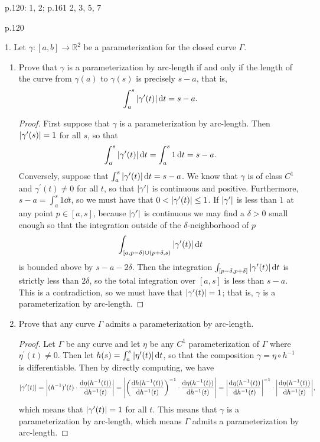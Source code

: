 \documentclass[11pt]{article}
\newcommand{\br}[1]{\left(#1\right)}
\begin{document}
p.120: 1, 2; p.161 2, 3, 5, 7

p.120

1. Let $\gamma\colon [a,b]\to \mathbb{R}^2$ be a parameterization for the closed curve $\Gamma$.
\begin{enumerate}[label=(\alph*)]
    \item Prove that $\gamma$ is a parameterization by arc-length if and only if the length of the curve from $\gamma(a)$ to $\gamma(s)$ is precisely $s-a$, that is,
    \[\int_a^s \abs{\gamma^{\prime}(t)}\dd{t} = s-a.\]
    \begin{proof}
      First suppose that $\gamma$ is a parameterization by arc-length. Then $\abs{\gamma^{\prime}(s)} = 1$ for all $s$, so that \[\int_a^s \abs{\gamma^{\prime}(t)}\dd{t} = \int_a^s 1 \dd{t} = s-a.\]
      Conversely, suppose that $\int_a^s \abs{\gamma^{\prime}(t)}\dd{t} = s-a$. We know that $\gamma$ is of class $C^1$ and $\gamma^{\prime}(t)\neq 0$ for all $t$, so that $\abs{\gamma^{\prime}}$ is continuous and positive. Furthermore, $s-a =\int_a^s 1 \dd{t}$, so we must have that $0 < \abs{\gamma^{\prime}(t)} \leq 1$. If $\abs{\gamma^{\prime}}$ is less than $1$ at any point $p\in [a,s]$, because $\abs{\gamma^{\prime}}$ is continuous we may find a $\delta > 0$ small enough so that the integration outside of the $\delta$-neighborhood of $p$ \[\int_{[a,p-\delta)\cup (p+\delta, s)}\abs{\gamma^{\prime}(t)}\dd{t}\]
      is bounded above by $s-a-2\delta$. Then the integration $\int_{[p-\delta, p+\delta]}\abs{\gamma^{\prime}(t)}\dd{t}$ is strictly less than $2\delta$, so the total integration over $[a,s]$ is less than $s-a$. This is a contradiction, so we must have that $\abs{\gamma^{\prime}(t)} = 1$; that is, $\gamma$ is a parameterization by arc-length.
    \end{proof}
    \item Prove that any curve $\Gamma$ admits a parameterization by arc-length. 
    \begin{proof}
      Let $\Gamma$ be any curve and let $\eta$ be any $C^1$ parameterization of $\Gamma$ where $\eta^{\prime}(t)\neq 0$. Then let $h(s) = \int_a^s\abs{\eta^{\prime}(t)}\dd{t}$, so that the composition $\gamma = \eta \circ h^{-1}$ is differentiable. Then by directly computing, we have \[\abs{\gamma^{\prime}(t)} = \abs{(h^{-1})^{\prime}(t)\cdot \dv{\eta(h^{-1}(t))}{h^{-1}(t)}} = \abs{ \br{ \dv{h(h^{-1}(t))}{h^{-1}(t)} }^{-1} \cdot \dv{\eta(h^{-1}(t))}{h^{-1}(t)}} = \abs{\dv{\eta(h^{-1}(t))}{h^{-1}(t)}}^{-1}\cdot \abs{\dv{\eta(h^{-1}(t))}{h^{-1}(t)}},\] which means that $\abs{\gamma^{\prime}(t)} = 1$ for all $t$. This means that $\gamma$ is a parameterization by arc-length, which means $\Gamma$ admits a parameterization by arc-length.
    \end{proof}
\end{enumerate} 
\end{document}
